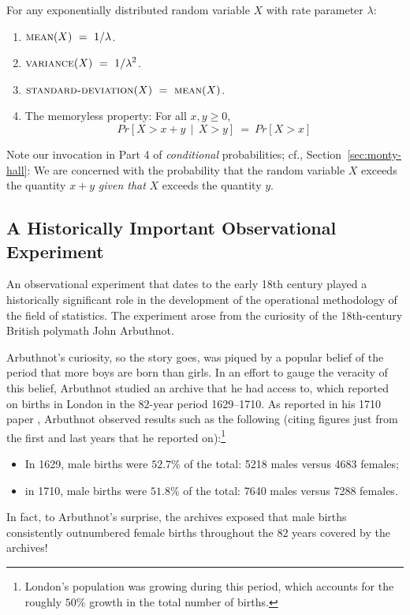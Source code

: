 \begin{prop}
\label{thm:exponential-moments}
For any exponentially distributed random variable $X$ with rate parameter $\lambda$:
\begin{enumerate}
\item
$\displaystyle \mbox{\sc mean}(X) \ = \ 1 / \lambda$.

\medskip\item
$\displaystyle \mbox{\sc variance}(X) \ = \ 1 / \lambda^2$.

\medskip\item
$\displaystyle  \mbox{\sc standard-deviation}(X) \ = \  \mbox{\sc mean}(X)$.

\medskip\item
The memoryless property:  For all $x, y \geq 0$,
\[ Pr[X > x+y \ \ | \ \ X > y] \ = \ Pr[X > x] \]
\end{enumerate}
\end{prop}

Note our invocation in Part 4 of {\em conditional} probabilities; cf., Section~\ref{sec:monty-hall}: We are concerned with the probability that the random variable $X$ exceeds the quantity $x+y$ {\em given that} $X$ exceeds the quantity $y$.


\subsection{A Historically Important Observational Experiment}
\label{sec:Arbuthnot}

An observational experiment that dates to the early 18th century played a historically significant role in the development of the operational methodology of the field of statistics.  The experiment arose from the curiosity of the 18th-century British polymath John Arbuthnot.

\smallskip

Arbuthnot's curiosity, so the story goes, was piqued by a popular belief of the period that more boys are born than girls.  In an effort to gauge the veracity of this belief, Arbuthnot studied an archive that he had access to, which reported on births in London in the $82$-year period 1629--1710.  As reported in his 1710 paper \cite{Arbuthnot}, Arbuthnot observed results such as the following (citing figures just from the first and last years that he reported on):\footnote{London's population was growing during this period, which accounts for the roughly $50\%$ growth in the total number of births.}
\begin{itemize}
\item
In 1629, male births were $52.7\%$ of the total: 5218 males versus 4683 females;
\medskip\item
in 1710, male births were $51.8\%$ of the total: 7640 males versus 7288 females.
\end{itemize}
In fact, to Arbuthnot's surprise, the archives exposed that male births consistently outnumbered female births throughout the $82$ years covered by the archives!

